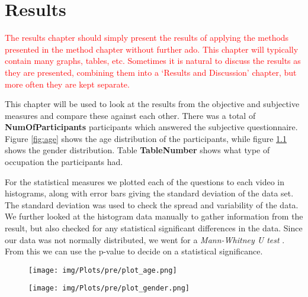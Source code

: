 \chapter{Results}\label{cha:results}
%
\textcolor{red}{The results chapter should simply present the results of applying the methods presented in the method chapter without further ado. This chapter will typically contain many graphs, tables, etc. Sometimes it is natural to discuss the results as they are presented, combining them into a `Results and Discussion' chapter, but more often they are kept separate.}

This chapter will be used to look at the results from the objective and subjective measures and compare these against each other. There was a total of \textbf{NumOfParticipants}  participants which answered the subjective questionnaire. Figure \ref{fig:age} shows the age distribution of the participants, while figure \ref{fig:gender} shows the gender distribution. Table \textbf{TableNumber} shows what type of occupation the participants had. 

For the statistical measures we plotted each of the questions to each video in histograms, along with error bars giving the standard deviation of the data set. The standard deviation was used to check the spread and variability of the data. We further looked at the histogram data manually to gather information from the result, but also checked for any statistical significant differences in the data. Since our data was not normally distributed, we went for a \textit{Mann-Whitney U test} \cite{wiki_mann-whitney}. From this we can use the p-value to decide on a statistical significance. 

\begin{figure}
\centering
\begin{minipage}{.5\textwidth}
  \centering
  \texttt{[image: img/Plots/pre/plot\_age.png]}
  \label{fig:age}
\end{minipage}%
\begin{minipage}{.5\textwidth}
  \centering
  \texttt{[image: img/Plots/pre/plot\_gender.png]}
  \label{fig:gender}
\end{minipage}
\end{figure}



